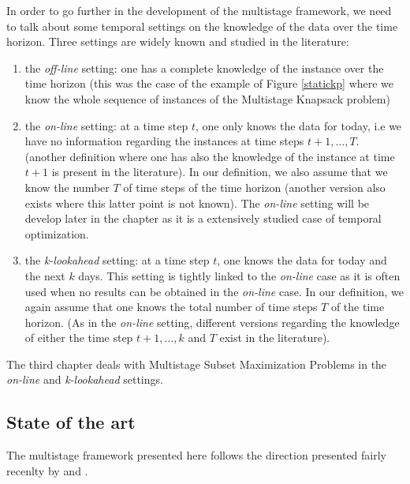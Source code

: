 \documentclass[a4paper]{book}
\begin{document}
In order to go further in the development of the multistage framework, we need to talk about some temporal settings on the knowledge of the data over the time horizon. Three settings are widely known and studied in the literature:
\begin{enumerate}
    \item the \emph{off-line} setting: one has a complete knowledge of the instance over the time horizon (this was the case of the example of Figure \ref{statickp} where we know the whole sequence of instances of the {\sc Multistage Knapsack} problem)
    \item the \emph{on-line} setting: at a time step $t$, one only knows the data for today, i.e we have no information regarding the instances at time steps $t+1,\ldots,T$. (another definition where one has also the knowledge of the instance at time $t+1$ is present in the literature). In our definition, we also assume that we know the number $T$ of time steps of the time horizon (another version also exists where this latter point is not known). The \emph{on-line} setting will be develop later in the chapter as it is a extensively studied case of temporal optimization.
    \item the \emph{k-lookahead} setting: at a time step $t$, one knows the data for today and the next $k$ days. This setting is tightly linked to the \emph{on-line} case as it is often used when no results can be obtained in the \emph{on-line} case. In our definition, we again assume that one knows the total number of time steps $T$ of the time horizon. (As in the \emph{on-line} setting, different versions regarding the knowledge of either the time step $t+1,\ldots,k$ and $T$ exist in the literature).
\end{enumerate}

The third chapter deals with Multistage Subset Maximization Problems in the \emph{on-line} and \emph{k-lookahead} settings. \\

\subsection{State of the art}

The multistage framework presented here follows the direction presented fairly recenlty by \cite{Gupta} and \cite{Eisenstat}.\\
\end{document}
